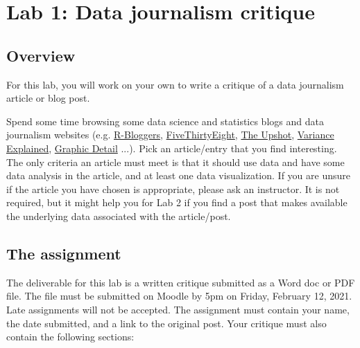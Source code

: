 \documentclass{article}\usepackage[]{graphicx}\usepackage[]{color}
\begin{document}

\section*{Lab 1: Data journalism critique}

\subsection*{Overview}
For this lab, you will work on your own to write a critique of a data journalism article or blog post. 

Spend some time browsing some data science and statistics blogs and data journalism websites (e.g. \href{https://www.r-bloggers.com/}{R-Bloggers}, \href{http://fivethirtyeight.com/}{FiveThirtyEight}, \href{https://www.nytimes.com/section/upshot}{The Upshot}, \href{http://varianceexplained.org/}{Variance Explained}, \href{https://www.economist.com/graphic-detail/}{Graphic Detail} ...). Pick an article/entry that you find interesting. The only criteria an article must meet is that it should use data and have some data analysis in the article, and at least one data visualization. If you are unsure if the article you have chosen is appropriate, please ask an instructor. It is not required, but it might help you for Lab 2 if you find a post that makes available the underlying data associated with the article/post. 

\subsection*{The assignment}
The deliverable for this lab is a written critique submitted as a Word doc or PDF file. The file must be submitted on Moodle by 5pm on Friday, February 12, 2021. Late assignments will not be accepted. The assignment must contain your name, the date submitted, and a link to the original post. Your critique must also contain the following sections:
\end{document}
